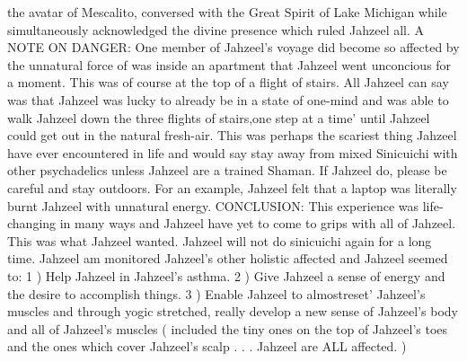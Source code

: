 \documentclass[12pt]{book}
\begin{document}
the avatar of Mescalito, conversed with the Great Spirit of Lake Michigan while simultaneously acknowledged the divine presence which ruled Jahzeel all. A NOTE ON DANGER: One member of Jahzeel's voyage did become so affected by the unnatural force of was inside an apartment that Jahzeel went unconcious for a moment. This was of course at the top of a flight of stairs. All Jahzeel can say was that Jahzeel was lucky to already be in a state of one-mind and was able to walk Jahzeel down the three flights of stairs,one step at a time' until Jahzeel could get out in the natural fresh-air. This was perhaps the scariest thing Jahzeel have ever encountered in life and would say stay away from mixed Sinicuichi with other psychadelics unless Jahzeel are a trained Shaman. If Jahzeel do, please be careful and stay outdoors. For an example, Jahzeel felt that a laptop was literally burnt Jahzeel with unnatural energy. CONCLUSION: This experience was life-changing in many ways and Jahzeel have yet to come to grips with all of Jahzeel. This was what Jahzeel wanted. Jahzeel will not do sinicuichi again for a long time. Jahzeel am monitored Jahzeel's other holistic affected and Jahzeel seemed to: 1 ) Help Jahzeel in Jahzeel's asthma. 2 ) Give Jahzeel a sense of energy and the desire to accomplish things. 3 ) Enable Jahzeel to almostreset' Jahzeel's muscles and through yogic stretched, really develop a new sense of Jahzeel's body and all of Jahzeel's muscles ( included the tiny ones on the top of Jahzeel's toes and the ones which cover Jahzeel's scalp . . .  Jahzeel are ALL affected. )
\end{document}
